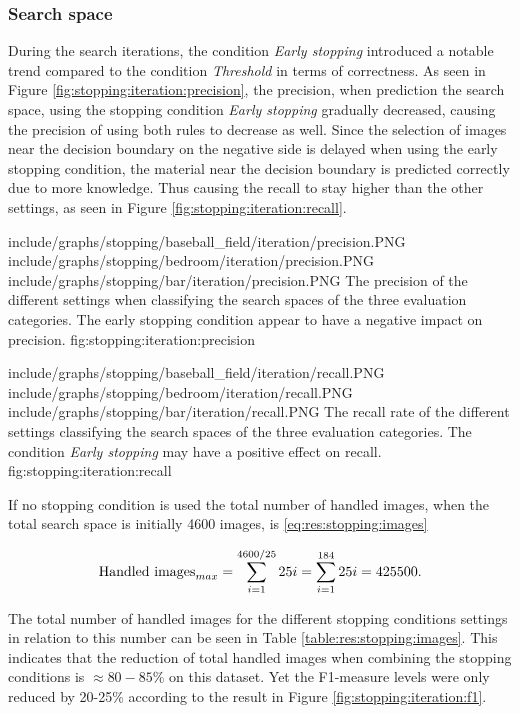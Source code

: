 \subsubsection{Search space}
\label{sec:result:stopping:iterations}
During the search iterations, the condition \emph{Early stopping} introduced a notable trend compared to the condition \emph{Threshold} in terms of correctness. As seen in Figure \ref{fig:stopping:iteration:precision}, the precision, when prediction the search space, using the stopping condition \emph{Early stopping} gradually decreased, causing the precision of using both rules to decrease as well. Since the selection of images near the decision boundary on the negative side is delayed when using the early stopping condition, the material near the decision boundary is predicted correctly due to more knowledge. Thus causing the recall to stay higher than the other settings, as seen in Figure \ref{fig:stopping:iteration:recall}.

\tripfigurenear
{include/graphs/stopping/baseball_field/iteration/precision.PNG}
{include/graphs/stopping/bedroom/iteration/precision.PNG}
{include/graphs/stopping/bar/iteration/precision.PNG}
{The precision of the different settings when classifying the search spaces of the three evaluation categories. The early stopping condition appear to have a negative impact on precision.}
{fig:stopping:iteration:precision}

\tripfigurenear
{include/graphs/stopping/baseball_field/iteration/recall.PNG}
{include/graphs/stopping/bedroom/iteration/recall.PNG}
{include/graphs/stopping/bar/iteration/recall.PNG}
{The recall rate of the different settings classifying the search spaces of the three evaluation categories. The condition \emph{Early stopping} may have a positive effect on recall.}
{fig:stopping:iteration:recall}

If no stopping condition is used the total number of handled images, when the total search space is initially 4600 images, is \ref{eq:res:stopping:images}

\begin{equation}
\label{eq:res:stopping:images}
\textnormal{Handled images}_{max} = \sum_{i=1}^{4600/25}{25i} =\sum_{i=1}^{184}{25i} = 425500.
\end{equation}

The total number of handled images for the different stopping conditions settings in relation to this number can be seen in Table \ref{table:res:stopping:images}. This indicates that the reduction of total handled images when combining the stopping conditions is $\approx80-85\%$ on this dataset. Yet the F1-measure levels were only reduced by 20-25\% according to the result in Figure \ref{fig:stopping:iteration:f1}. 

